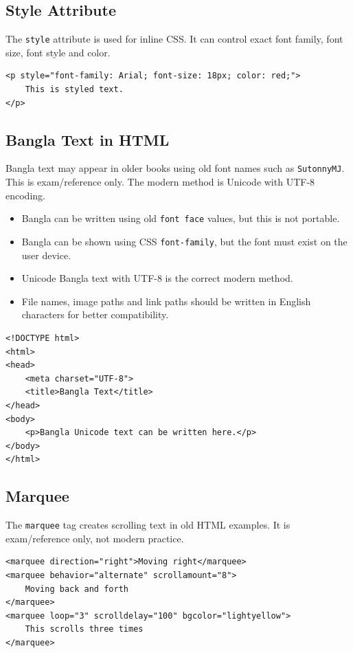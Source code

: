 \endgroup

\subsection{Style Attribute}
The \texttt{style} attribute is used for inline CSS. It can control exact font family, font size, font style and color.

\begin{lstlisting}[style=htmlide, caption={Font Styling with CSS}]
<p style="font-family: Arial; font-size: 18px; color: red;">
    This is styled text.
</p>
\end{lstlisting}

\subsection{Bangla Text in HTML}
Bangla text may appear in older books using old font names such as \texttt{SutonnyMJ}. This is exam/reference only. The modern method is Unicode with UTF-8 encoding.

\begin{itemize}
    \item Bangla can be written using old \texttt{font face} values, but this is not portable.
    \item Bangla can be shown using CSS \texttt{font-family}, but the font must exist on the user device.
    \item Unicode Bangla text with UTF-8 is the correct modern method.
    \item File names, image paths and link paths should be written in English characters for better compatibility.
\end{itemize}

\begin{lstlisting}[style=htmlide, caption={UTF-8 and Unicode Bangla}]
<!DOCTYPE html>
<html>
<head>
    <meta charset="UTF-8">
    <title>Bangla Text</title>
</head>
<body>
    <p>Bangla Unicode text can be written here.</p>
</body>
</html>
\end{lstlisting}

\subsection{Marquee}
The \texttt{marquee} tag creates scrolling text in old HTML examples. It is exam/reference only, not modern practice.

\begin{lstlisting}[style=htmlide, caption={Marquee Variations}]
<marquee direction="right">Moving right</marquee>
<marquee behavior="alternate" scrollamount="8">
    Moving back and forth
</marquee>
<marquee loop="3" scrolldelay="100" bgcolor="lightyellow">
    This scrolls three times
</marquee>
\end{lstlisting}

